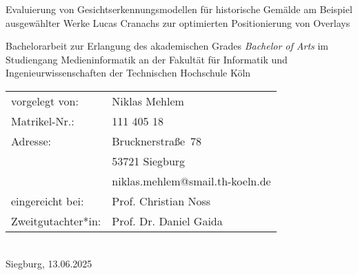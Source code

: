 \begin{titlepage}
%
\sffamily%
%
\begin{center}
\end{center}
%
\vfill
%
\begin{huge}
Evaluierung von Gesichtserkennungsmodellen für historische Gemälde am Beispiel ausgewählter Werke Lucas Cranachs zur optimierten Positionierung von Overlays\\[10mm]
\end{huge}
%
Bachelorarbeit zur Erlangung des akademischen Grades\newline
\emph{Bachelor of Arts}\newline
im Studiengang Medieninformatik\newline
an der Fakultät für Informatik und Ingenieurwissenschaften\newline
der Technischen Hochschule Köln
%
\vfill
%
\begin{tabular}{@{}ll}
vorgelegt von: & Niklas Mehlem\\
Matrikel-Nr.:  & 111 405 18\\
Adresse:       & Brucknerstraße~78\\
               & 53721 Siegburg\\
               & niklas.mehlem@smail.th-koeln.de\\[5mm]
eingereicht bei:   & Prof. Christian Noss\\
Zweitgutachter*in: & Prof. Dr. Daniel Gaida
\end{tabular}	
%
\\[10mm]
%
Siegburg, 13.06.2025%
%
\rmfamily%
%
\end{titlepage}